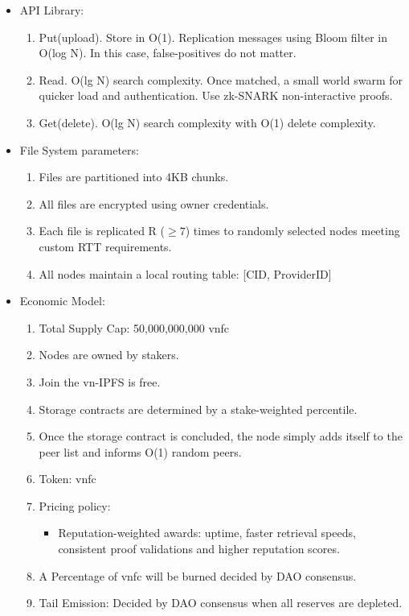 \documentclass[conference]{IEEEtran}
\begin{document}
\begin{itemize}
    \item API Library:
    \begin{enumerate}
        \item Put(upload). Store in O(1). Replication messages using Bloom filter in O(log N). In this case, false-positives do not matter.
        \item Read. O(lg N) search complexity. Once matched, a small world swarm for quicker load and authentication. Use zk-SNARK non-interactive proofs.
        \item Get(delete).  O(lg N) search complexity with O(1) delete complexity.
    \end{enumerate}

    \item File System parameters:
    \begin{enumerate}
        \item Files are partitioned into 4KB chunks.
        \item All files are encrypted using owner credentials.
        \item Each file is replicated R ($\ge7$) times to randomly selected nodes meeting custom RTT requirements.
        \item All nodes maintain a local routing table: [CID, ProviderID]
    \end{enumerate}

    \item Economic Model:
    \begin{enumerate}
        \item Total Supply Cap: 50,000,000,000 vnfc
        \item Nodes are owned by stakers.
        \item Join the vn-IPFS is free.
        \item Storage contracts are determined by a stake-weighted percentile.
        \item Once the storage contract is concluded, the node simply adds itself to the peer list and informs O(1) random peers.
        \item Token: vnfc
        \item Pricing policy:
        \begin{itemize}
            \item Reputation-weighted awards: uptime, faster retrieval speeds, consistent proof validations and higher reputation scores.
        \end{itemize}
        \item A Percentage of vnfc will be burned decided by DAO consensus.
        \item Tail Emission: Decided by DAO consensus when all reserves are depleted.
    \end{enumerate}


\end{itemize}
\end{document}
